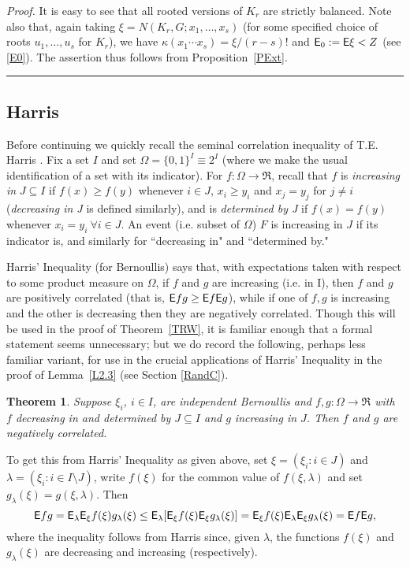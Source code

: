 \documentclass[letterpaper,11pt]{article}
\newtheorem{thm}{Theorem}[section]
\newcommand{\nin}[0]{\noindent}
\newcommand{\sub}[0]{\subseteq}
\newcommand{\sm}[0]{\setminus}
\renewcommand{\dots}[0]{,\ldots,}
\newcommand{\ra}[0]{\rightarrow}
\newcommand{\0}[0]{\emptyset}
\renewcommand{\qed}[0]{\begin{flushright} \rule{2mm}{3mm} \end{flushright}}
\newcommand{\gl}[0]{\lambda }
\newcommand{\gO}[0]{\Omega}
\begin{document}
\nin
{\em Proof.}
It is easy to see
that all rooted versions of $K_r$ are strictly balanced.
Note also that, again
taking $\xi =N(K_r,G;x_1\dots x_s)$
(for some specified choice of roots $u_1\dots u_s$ for $K_r$), we have
$\kappa(x_1\cdots x_s) = \xi/(r-s)!$
and ${\sf E}_0:={\sf E}\xi< Z$
(see \eqref{E0}).
The assertion thus follows from
Proposition~\ref{PExt}.\qed




\subsection{Harris}\label{SecHarris}


Before continuing we quickly recall the seminal
correlation inequality of T.E. Harris \cite{Harris}.
%
Fix a set $I$ and set $\gO = \{0,1\}^I\equiv 2^I$
(where we make the usual identification of a set with its
indicator).
For $f:\gO\ra \Re$,
recall that
$f$ is {\em increasing in} $J\sub I$
if $f(x)\geq f(y)$ whenever $i\in J$, $x_i\geq y_i$
and $x_j=y_j$ for $j\neq i$
({\em decreasing in J} is defined similarly),
and is {\em determined by J} if $f(x)=f(y)$
whenever $x_i=y_i ~\forall i\in J$.
An event (i.e. subset of $\gO$)
$F$ is increasing in $J$ if its indicator is, and similarly
for ``decreasing in" and ``determined by."

Harris' Inequality (for Bernoullis)
says that, with expectations taken with respect to some product measure on $\gO$,
if $f$ and $g$ are increasing (i.e. in I),
then $f$ and $g$ are positively correlated
(that is, ${\sf E} fg\geq {\sf E} f {\sf E} g$), while
if one of $f,g$ is increasing and the other is
decreasing then they are negatively correlated.
Though this will be used in the proof of Theorem~\ref{TRW},
it is familiar enough that a formal statement seems unnecessary;
but we do record the following, perhaps
less familiar variant, for use in the crucial
applications of Harris' Inequality in the proof of Lemma~\ref{L2.3}
(see Section \ref{RandC}).

\begin{thm}\label{Harris}
Suppose $\xi_i$, $i\in I$, are independent Bernoullis
and $f,g:\gO\ra\Re$
with $f$ decreasing in and determined by
$J\sub I$ and
$g $ increasing in $J$.
Then $f$ and $g$ are negatively correlated.
\end{thm}

\nin
To get this from Harris' Inequality as given above,
set $\xi =(\xi_i:i\in J)$ and $\gl =(\xi_i:i\in I\sm J)$,
write $f(\xi)$ for the common value of $f(\xi,\gl)$
and set $g_\gl(\xi)=g(\xi,\gl) $.
Then
\[%
\E fg = \E_\gl\E_\xi f(\xi)g_\gl(\xi)
\leq \E_\gl [\E_\xi f(\xi)\E_\xi g_\gl(\xi)]
= \E_\xi f(\xi)\E_\gl  \E_\xi g_\gl(\xi)
=\E f \E g,
\]
where the inequality follows from Harris since,
given $\gl$, the functions $f(\xi)$ and $ g_{\gl}(\xi)$
are decreasing and increasing
(respectively).
\end{document}
